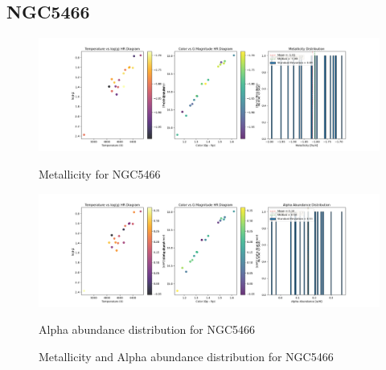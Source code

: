 \documentclass[a4paper,12pt]{article}
\begin{document}
\subsection{NGC5466}
\begin{figure}[H]
    \centering
    \begin{minipage}[b]{0.8\textwidth}
        \centering
        \includegraphics[width=\textwidth]{NGC5466_metalicity.png}
        \caption{Metallicity for NGC5466}
        \label{fig:NGC5466_metalicity}
    \end{minipage}
    \hfill
    \begin{minipage}[b]{0.8\textwidth}
        \centering
        \includegraphics[width=\textwidth]{NGC5466_alpha.png}
        \caption{Alpha abundance distribution for NGC5466}
        \label{fig:NGC5466_alpha}
    \end{minipage}
    \caption{Metallicity and Alpha abundance distribution for NGC5466}
    \label{fig:NGC5466_combined}
\end{figure}
\clearpage
\end{document}
